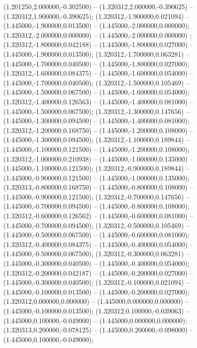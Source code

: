  (1.201250,2.000000,-0.302500) -- (1.320312,2.000000,-0.390625) -- (1.320312,1.900000,-0.390625);
 (1.320312,-1.900000,0.021094) -- (1.445000,-1.900000,0.013500) -- (1.445000,-2.000000,0.000000);
 (1.320312,-2.000000,0.000000) -- (1.445000,-2.000000,0.000000) ;
 (1.320312,-1.800000,0.042188) -- (1.445000,-1.800000,0.027000) -- (1.445000,-1.900000,0.013500);
 (1.320312,-1.700000,0.063281) -- (1.445000,-1.700000,0.040500) -- (1.445000,-1.800000,0.027000);
 (1.320312,-1.600000,0.084375) -- (1.445000,-1.600000,0.054000) -- (1.445000,-1.700000,0.040500);
 (1.320312,-1.500000,0.105469) -- (1.445000,-1.500000,0.067500) -- (1.445000,-1.600000,0.054000);
 (1.320312,-1.400000,0.126563) -- (1.445000,-1.400000,0.081000) -- (1.445000,-1.500000,0.067500);
 (1.320312,-1.300000,0.147656) -- (1.445000,-1.300000,0.094500) -- (1.445000,-1.400000,0.081000);
 (1.320312,-1.200000,0.168750) -- (1.445000,-1.200000,0.108000) -- (1.445000,-1.300000,0.094500);
 (1.320312,-1.100000,0.189844) -- (1.445000,-1.100000,0.121500) -- (1.445000,-1.200000,0.108000);
 (1.320312,-1.000000,0.210938) -- (1.445000,-1.000000,0.135000) -- (1.445000,-1.100000,0.121500);
 (1.320312,-0.900000,0.189844) -- (1.445000,-0.900000,0.121500) -- (1.445000,-1.000000,0.135000);
 (1.320313,-0.800000,0.168750) -- (1.445000,-0.800000,0.108000) -- (1.445000,-0.900000,0.121500);
 (1.320312,-0.700000,0.147656) -- (1.445000,-0.700000,0.094500) -- (1.445000,-0.800000,0.108000);
 (1.320312,-0.600000,0.126562) -- (1.445000,-0.600000,0.081000) -- (1.445000,-0.700000,0.094500);
 (1.320312,-0.500000,0.105469) -- (1.445000,-0.500000,0.067500) -- (1.445000,-0.600000,0.081000);
 (1.320312,-0.400000,0.084375) -- (1.445000,-0.400000,0.054000) -- (1.445000,-0.500000,0.067500);
 (1.320312,-0.300000,0.063281) -- (1.445000,-0.300000,0.040500) -- (1.445000,-0.400000,0.054000);
 (1.320312,-0.200000,0.042187) -- (1.445000,-0.200000,0.027000) -- (1.445000,-0.300000,0.040500);
 (1.320312,-0.100000,0.021094) -- (1.445000,-0.100000,0.013500) -- (1.445000,-0.200000,0.027000);
 (1.320312,0.000000,0.000000) -- (1.445000,0.000000,0.000000) -- (1.445000,-0.100000,0.013500);
 (1.320312,0.100000,-0.039063) -- (1.445000,0.100000,-0.049000) -- (1.445000,0.000000,0.000000);
 (1.320313,0.200000,-0.078125) -- (1.445000,0.200000,-0.098000) -- (1.445000,0.100000,-0.049000);
